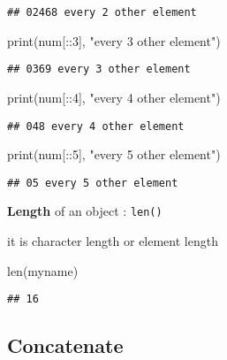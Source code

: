 \documentclass[
]{book}
\newenvironment{Shaded}{\begin{snugshade}}{\end{snugshade}}
\newcommand{\BuiltInTok}[1]{#1}
\newcommand{\DecValTok}[1]{\textcolor[rgb]{0.00,0.00,0.81}{#1}}
\newcommand{\NormalTok}[1]{#1}
\newcommand{\StringTok}[1]{\textcolor[rgb]{0.31,0.60,0.02}{#1}}
\begin{document}
\begin{verbatim}
## 02468 every 2 other element
\end{verbatim}

\begin{Shaded}
\begin{Highlighting}[]
\BuiltInTok{print}\NormalTok{(num[::}\DecValTok{3}\NormalTok{], }\StringTok{"every 3 other element"}\NormalTok{)}
\end{Highlighting}
\end{Shaded}

\begin{verbatim}
## 0369 every 3 other element
\end{verbatim}

\begin{Shaded}
\begin{Highlighting}[]
\BuiltInTok{print}\NormalTok{(num[::}\DecValTok{4}\NormalTok{], }\StringTok{"every 4 other element"}\NormalTok{)}
\end{Highlighting}
\end{Shaded}

\begin{verbatim}
## 048 every 4 other element
\end{verbatim}

\begin{Shaded}
\begin{Highlighting}[]
\BuiltInTok{print}\NormalTok{(num[::}\DecValTok{5}\NormalTok{], }\StringTok{"every 5 other element"}\NormalTok{)}
\end{Highlighting}
\end{Shaded}

\begin{verbatim}
## 05 every 5 other element
\end{verbatim}

\textbf{Length} of an object : \texttt{len()}

it is character length or element length

\begin{Shaded}
\begin{Highlighting}[]
\BuiltInTok{len}\NormalTok{(myname)}
\end{Highlighting}
\end{Shaded}

\begin{verbatim}
## 16
\end{verbatim}

\hypertarget{concatenate}{%
\subsection{Concatenate}\label{concatenate}}
\end{document}
